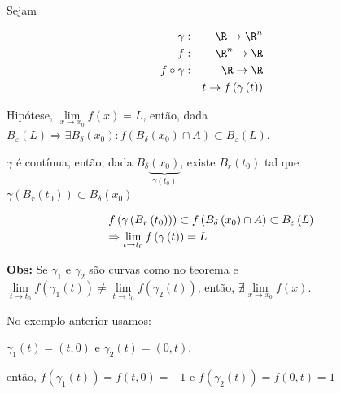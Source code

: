 \documentclass{book}
\begin{document}
\begin{dem}
Sejam

\begin{eqnarray*}
\gamma &:&\R \to \R^n  \hfill \\
f&:&\R^n  \to \R \hfill \\
f \circ \gamma &:&\R \to \R \hfill \\
&& t \to f\left( {\gamma \left( t \right)} \right) \hfill \\
\end{eqnarray*}

    Hip\'otese, $\mathop {\lim }\limits_{x \to x_0 } f\left( x \right) = L$, ent\~ao, dada $B_\varepsilon  \left( L \right) \Rightarrow \exists B_\delta  \left( {x_0 } \right):f\left( {B_\delta  \left( {x_0 } \right) \cap A} \right) \subset B_\varepsilon  \left( L \right)$.


    $\gamma$ \'e cont\'inua, ent\~ao, dada $B_\delta  \underbrace {\left( {x_0 } \right)}_{\gamma \left( {t_0 } \right)}$, existe $B_r \left( {t_0 } \right)$ tal que $\gamma \left( {B_r \left( {t_0 } \right)} \right) \subset B_\delta  \left( {x_0 } \right)$

\[
\begin{gathered}
  f\left( {\gamma \left( {B_r \left( {t_0 } \right)} \right)} \right) \subset f\left( {B_\delta  \left( {x_0 } \right) \cap A} \right) \subset B_\varepsilon  \left( L \right) \hfill \\
   \Rightarrow \mathop {\lim }\limits_{t \to t_0 } f\left( {\gamma \left( t \right)} \right) = L \hfill \\
\end{gathered}
\]

\end{dem}

\textbf{Obs:} Se $\gamma_1$ e $\gamma_2$ s\~ao curvas como no teorema e $\mathop {\lim }\limits_{t \to t_0 } f\left( {\gamma _1 \left( t \right)} \right) \ne \mathop {\lim }\limits_{t \to t_0 } f\left( {\gamma _2 \left( t \right)} \right)$, ent\~ao, $\nexists \mathop {\lim }\limits_{x \to x_0 } f\left( x \right)$.

\begin{ex}
No exemplo anterior usamos:
\end{ex}

\begin{sol}
    $\gamma _1 \left( t \right) = \left( {t,0} \right)$ e $\gamma _2 \left( t \right) = \left( {0,t} \right)$,

     ent\~ao, $f\left( {\gamma _1 \left( t \right)} \right) = f\left( {t,0} \right) =  - 1$ e $f\left( {\gamma _2 \left( t \right)} \right) = f\left( {0,t} \right) = 1$
\end{sol}
\end{document}

